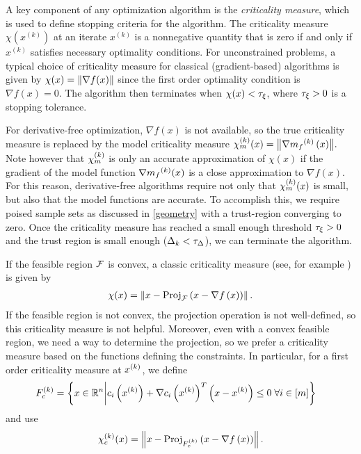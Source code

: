 \label{criticality_measure_section}
\label{criticallity_measure_section}

A key component of any optimization algorithm is the {\em criticality measure}, which is used to define stopping criteria for the algorithm.
The criticality measure $\chi(x^{(k)})$ at an iterate $x^{(k)}$ is a nonnegative quantity that is zero if and only if $x^{(k)}$ satisfies necessary optimality conditions.
For unconstrained problems,  a typical choice of criticality measure for classical (gradient-based) algorithms is given by $\chi(x) = {\left\|\nabla f(x)\right\|}$
since the first order optimality condition is $\nabla f(x)=0$.
The algorithm then terminates when $\chi(x) < \tau_{\xi}$, where $\tau_{\xi} >0$ is a stopping tolerance.

For derivative-free optimization,  $\nabla f(x)$ is not available,  so the true criticality measure is replaced by the model criticality measure
${\chi_m^{(k)}}(x) = {\left\|\nabla {{m}_f}^{(k)}\left(x\right)\right\|}.$
Note however that ${\chi_m^{(k)}}$ is only an accurate approximation of $\chi(x)$ if the gradient of the model function $\nabla {{m}_f}^{(k)}(x)$ is a close approximation to $\nabla f(x)$.
For this reason, derivative-free algorithms require not only that ${\chi_m^{(k)}}(x)$ is small, but also that the model functions are accurate.
To accomplish this, we require poised sample sets as discussed in \cref{geometry} with a trust-region converging to zero.
Once the criticality measure has reached a small enough threshold $\tau_{\xi} > 0$ and the trust region is small enough ($\Delta_k < \tau_{\Delta}$),
we can terminate the algorithm.



If the feasible region ${\mathcal F}$ is convex, a classic criticality measure (see, for example \cite{Conejo:2013:GCT:2620806.2621814} \cite{Conn:2000:TM:357813}) is given by
\begin{align*}
\chi(x) = \left\|x - {\textrm{Proj}}_{{\mathcal F}}\left(x- \nabla f\left(x\right)\right)\right\|.
\end{align*}
If the feasible region is not convex, the projection operation is not well-defined, so this criticality measure is not helpful.
Moreover,  even with a convex feasible region, we need a way to determine the projection, so we prefer a criticality measure based on the  functions defining the constraints.   In particular, for
a first order criticality measure at $x^{(k)}$, we define
\begin{align}
{F_c^{(k)}} &= \left\{ x \in \mathbb R^n \bigg| c_i\left(x^{(k)}\right) + \nabla c_i\left(x^{(k)}\right)^T \left(x - x^{(k)}\right) \le 0 \; \forall i \in [m] \right\} \label{define_truefeasiblek}
\end{align}
and use
\begin{align}
\chi_c^{(k)}(x) = \left\|x - {\textrm{Proj}}_{{F_c^{(k)}}}\left(x- \nabla f\left(x\right)\right)\right\|. \label{define_true_criticality}
\end{align}

